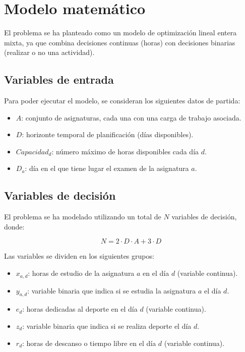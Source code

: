 \documentclass{article}
\begin{document}
\section{Modelo matemático}

El problema se ha planteado como un modelo de optimización lineal entera mixta, ya que combina decisiones continuas (horas) con decisiones binarias (realizar o no una actividad).

\subsection{Variables de entrada}

Para poder ejecutar el modelo, se consideran los siguientes datos de partida:

\begin{itemize}
    \item $A$: conjunto de asignaturas, cada una con una carga de trabajo asociada.
    \item $D$: horizonte temporal de planificación (días disponibles).
    \item $Capacidad_d$: número máximo de horas disponibles cada día $d$.
    \item $D_a$: día en el que tiene lugar el examen de la asignatura $a$.
\end{itemize}

\subsection{Variables de decisión}

El problema se ha modelado utilizando un total de $N$ variables de decisión, donde:

\[
N = 2 \cdot D \cdot A + 3 \cdot D
\]

Las variables se dividen en los siguientes grupos:

\begin{itemize}
    \item $x_{a,d}$: horas de estudio de la asignatura $a$ en el día $d$ (variable continua).
    \item $y_{a,d}$: variable binaria que indica si se estudia la asignatura $a$ el día $d$.
    \item $e_d$: horas dedicadas al deporte en el día $d$ (variable continua).
    \item $z_d$: variable binaria que indica si se realiza deporte el día $d$.
    \item $r_d$: horas de descanso o tiempo libre en el día $d$ (variable continua).
\end{itemize}
\end{document}
